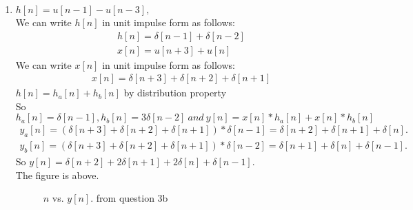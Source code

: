 \documentclass[10pt,a4paper, margin=1in]{article}
\begin{document}
\begin{enumerate}
\begin{enumerate}
    
    \item %
    \(h[n] = u[n-1] - u[n-3], \)\\
    We can write \(h[n]\) in unit impulse form as follows: 
    \begin{align}
        h[n] = \delta[n-1] + \delta[n-2] \\
        x[n] = u[n+3] + u[n] 
    \end{align}
    We can write \(x[n]\) in unit impulse form as follows:
    \begin{align}
        x[n] = \delta[n+3] + \delta[n+2] + \delta[n+1]
    \end{align}
    \(h[n] = h_a[n] + h_b[n]\) by distribution property \\
    So \(h_a[n] = \delta[n-1], h_b[n] = 3\delta[n-2] \ and \ y[n] = x[n] \ast h_a[n] + x[n] \ast h_b[n]\)\\
    \begin{align*}
        y_a[n] = (\delta[n+3] + \delta[n+2] + \delta[n+1]) \ast \delta[n-1] = \delta[n+2] + \delta[n+1] + \delta[n]. \\
        y_b[n] = (\delta[n+3] + \delta[n+2] + \delta[n+1]) \ast \delta[n-2] = \delta[n+1] + \delta[n] + \delta[n-1].
    \end{align*}
    So \(y[n] = \delta[n+2] + 2\delta[n+1]+ 2\delta[n] + \delta[n-1].\)\\
    
    The figure is above.
    
    \begin{figure} [ht!]
        \centering
        \caption{$n$ vs. $y[n]$. from question 3b}
        \label{fig:q3}
    \end{figure}
    

\end{enumerate}
\end{enumerate}
\end{document}
